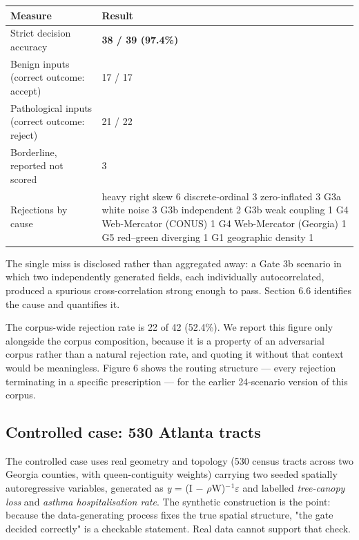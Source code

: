 \begin{table}[htbp]
\centering
\small
\begin{tabular}{p{}p{}}
\toprule
Measure & Result \\
\midrule
Strict decision accuracy & \textbf{38 / 39 (97.4\%)} \\
Benign inputs (correct outcome: accept) & 17 / 17 \\
Pathological inputs (correct outcome: reject) & 21 / 22 \\
Borderline, reported not scored & 3 \\
Rejections by cause & heavy right skew 6 \textperiodcentered{} discrete-ordinal 3 \textperiodcentered{} zero-inflated 3 \textperiodcentered{} G3a white noise 3 \textperiodcentered{} G3b independent 2 \textperiodcentered{} G3b weak coupling 1 \textperiodcentered{} G4 Web-Mercator (CONUS) 1 \textperiodcentered{} G4 Web-Mercator (Georgia) 1 \textperiodcentered{} G5 red--green diverging 1 \textperiodcentered{} G1 geographic density 1 \\
\bottomrule
\end{tabular}
\end{table}
The single miss is disclosed rather than aggregated away: a Gate 3b scenario in which two independently generated fields, each individually autocorrelated, produced a spurious cross-correlation strong enough to pass. Section 6.6 identifies the cause and quantifies it.

The corpus-wide rejection rate is 22 of 42 (52.4\%). We report this figure only alongside the corpus composition, because it is a property of an adversarial corpus rather than a natural rejection rate, and quoting it without that context would be meaningless. Figure 6 shows the routing structure --- every rejection terminating in a specific prescription --- for the earlier 24-scenario version of this corpus.

\subsection{Controlled case: 530 Atlanta tracts}
The controlled case uses real geometry and topology (530 census tracts across two Georgia counties, with queen-contiguity weights) carrying two seeded spatially autoregressive variables, generated as \emph{y} = (I $-$ $\rho$W)$^{-}$$^{1}$$\varepsilon$ and labelled \emph{tree-canopy loss} and \emph{asthma hospitalisation rate}. The synthetic construction is the point: because the data-generating process fixes the true spatial structure, "the gate decided correctly" is a checkable statement. Real data cannot support that check.

